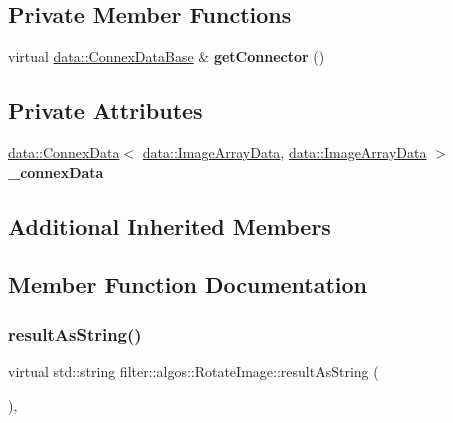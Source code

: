 \subsection*{Private Member Functions}
\begin{DoxyCompactItemize}
\item 
\mbox{\label{classfilter_1_1algos_1_1_rotate_image_abfd705eead1f8b430ef3b93e8ed924cc}} 
virtual \hyperlink{classfilter_1_1data_1_1_connex_data_base}{data\+::\+Connex\+Data\+Base} \& {\bfseries get\+Connector} ()
\end{DoxyCompactItemize}
\subsection*{Private Attributes}
\begin{DoxyCompactItemize}
\item 
\mbox{\label{classfilter_1_1algos_1_1_rotate_image_a235f6953f2293082156df89df4c19ead}} 
\hyperlink{classfilter_1_1data_1_1_connex_data}{data\+::\+Connex\+Data}$<$ \hyperlink{classfilter_1_1data_1_1_image_array_data}{data\+::\+Image\+Array\+Data}, \hyperlink{classfilter_1_1data_1_1_image_array_data}{data\+::\+Image\+Array\+Data} $>$ {\bfseries \+\_\+connex\+Data}
\end{DoxyCompactItemize}
\subsection*{Additional Inherited Members}


\subsection{Member Function Documentation}
\mbox{\label{classfilter_1_1algos_1_1_rotate_image_af9aeff9c2232e6fc97708cbc41ee1fb2}} 
\subsubsection{\texorpdfstring{result\+As\+String()}{resultAsString()}}
{\footnotesize\ttfamily virtual std\+::string filter\+::algos\+::\+Rotate\+Image\+::result\+As\+String (\begin{DoxyParamCaption}{ }\end{DoxyParamCaption})\hspace{0.3cm}{\ttfamily [inline]}, {\ttfamily [virtual]}}

